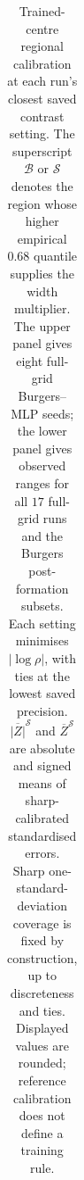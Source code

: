 \begin{table}[!htbp]
\begin{tabular}{@{}lrrrrrr@{}}
\bottomrule
\end{tabular}
\caption{Trained-centre regional calibration at each run's closest saved contrast setting.
The superscript $\mathcal B$ or $\mathcal S$ denotes the region whose higher empirical
$0.68$ quantile supplies the width multiplier. The upper panel gives eight full-grid
Burgers--MLP seeds; the lower panel gives observed ranges for all $17$ full-grid runs
and the Burgers post-formation subsets. Each setting minimises $|\log\rho|$, with ties
at the lowest saved precision. $\overline{|Z|}^{\mathcal S}$ and $\overline Z^{\mathcal S}$
are absolute and signed means of sharp-calibrated standardised errors.
Sharp one-standard-deviation coverage is fixed by construction, up to discreteness
and ties. Displayed values are rounded; reference calibration does not define a training rule.}
\label{tab:r4-oracles}
\end{table}
